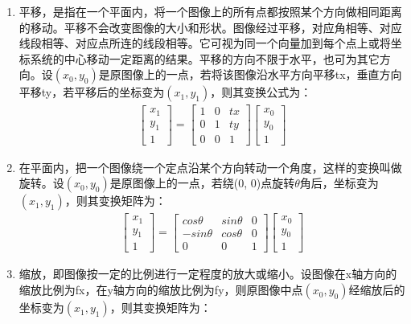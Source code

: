 \begin{enumerate}
\item 平移，是指在一个平面内，将一个图像上的所有点都按照某个方向做相同距离的移动。平移不会改变图像的大小和形状。图像经过平移，对应角相等、对应线段相等、对应点所连的线段相等。它可视为同一个向量加到每个点上或将坐标系统的中心移动一定距离的结果。平移的方向不限于水平，也可为其它方向。设$(x_0,y_0)$是原图像上的一点，若将该图像沿水平方向平移tx，垂直方向平移ty，若平移后的坐标变为$(x_1,y_1)$，则其变换公式为：
\begin{align}
\left[ \begin{array}{c}
x_1 \\
y_1 \\
1   
\end{array} \right]
=
\left[ \begin{array}{ccc}
1 & 0 & tx \\
0 & 1 & ty \\
0 & 0 & 1
\end{array} \right]
\left[ \begin{array}{c}
x_0 \\
y_0 \\
1
\end{array} \right]
\end{align}
\item 在平面内，把一个图像绕一个定点沿某个方向转动一个角度，这样的变换叫做旋转。设$(x_0,y_0)$是原图像上的一点，若绕(0, 0)点旋转$\theta$角后，坐标变为$(x_1,y_1)$，则其变换矩阵为：
\begin{align}
\left[ \begin{array}{c}
x_1 \\
y_1 \\
1   
\end{array} \right]
=
\left[ \begin{array}{ccc}
cos\theta & sin\theta & 0 \\
-sin\theta & cos\theta & 0 \\
0 & 0 & 1
\end{array} \right]
\left[ \begin{array}{c}
x_0 \\
y_0 \\
1
\end{array} \right]
\end{align}
\item 缩放，即图像按一定的比例进行一定程度的放大或缩小。设图像在x轴方向的缩放比例为fx，在y轴方向的缩放比例为fy，则原图像中点$(x_0, y_0)$经缩放后的坐标变为$(x_1, y_1)$，则其变换矩阵为：


\end{enumerate}
